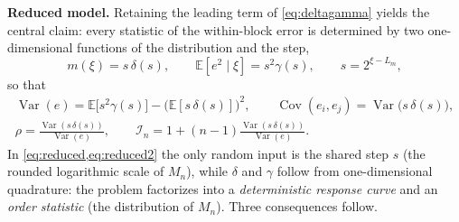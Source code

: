 \documentclass[twocolumn,review,hidelinks,oneeqnum,onetabnum,onefignum,onethmnum]{siamart251216}
\begin{document}
\noindent\textbf{Reduced model.} Retaining the leading term of
\cref{eq:deltagamma} yields the central claim: every statistic of the
within-block error is determined by two one-dimensional functions of the
distribution and the step,
\begin{equation}
m(\xi)=s\,\delta(s),\qquad
\mathbb{E}[e^2\mid\xi]=s^2\gamma(s),
\qquad s=2^{\xi-L_m},
\label{eq:reduced}
\end{equation}
so that
\begin{equation}
\begin{gathered}
\operatorname{Var}(e)=\mathbb{E}\bigl[s^2\gamma(s)\bigr]-\bigl(\mathbb{E}[s\,\delta(s)]\bigr)^2,
\qquad
\operatorname{Cov}(e_i,e_j)=\operatorname{Var}\bigl(s\,\delta(s)\bigr),\\[2pt]
\rho=\frac{\operatorname{Var}(s\,\delta(s))}{\operatorname{Var}(e)},
\qquad
\mathcal I_n=1+(n-1)\frac{\operatorname{Var}(s\,\delta(s))}{\operatorname{Var}(e)} .
\end{gathered}
\label{eq:reduced2}
\end{equation}
In \cref{eq:reduced,eq:reduced2} the only random input is the shared step $s$
(the rounded logarithmic scale of $M_n$), while $\delta$ and $\gamma$ follow
from one-dimensional quadrature: the problem factorizes into a
\emph{deterministic response curve} and an \emph{order statistic} (the
distribution of $M_n$). Three consequences follow.
\end{document}
